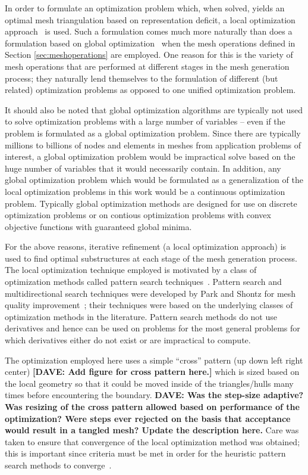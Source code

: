 In order to formulate an optimization problem which, when solved, yields 
an optimal mesh triangulation based on representation deficit, a local 
optimization approach~\cite{nocedal_wright_book} is used. Such a 
formulation comes much more naturally than does a formulation based on 
global optimization~\cite{global_optimization_book} when the 
mesh operations defined in Section \ref{sec:meshoperations} are 
employed.  One reason for this is the variety of mesh operations that are 
performed at different stages in the mesh generation process; they 
naturally lend themselves to the formulation of different (but related) 
optimization problems as opposed to one unified optimization problem.

It should also be noted that global optimization algorithms are typically 
not used to solve optimization problems with a large number of variables 
-- even if the problem is formulated as a global optimization problem.  
Since there are typically millions to billions of nodes and elements in 
meshes from application problems of interest, a global optimization 
problem would be impractical solve based on the huge number of variables 
that it would necessarily contain.  In addition, any global optimization 
problem which would be formulated as a generalization of the local 
optimization problems in this work would be a continuous optimization 
problem.  Typically global optimization methods are designed for use on 
discrete optimization problems or on contious optimization problems with 
convex objective functions with guaranteed global minima.

For the above reasons, iterative refinement (a local optimization 
approach) is used to find optimal substructures at each stage of the mesh 
generation process.  The local optimization technique employed is
motivated by a class of optimization methods called pattern search 
techniques~\cite{patternsearch1}.  Pattern search and multidirectional 
search techniques were developed by Park and Shontz for mesh quality 
improvement~\cite{patternsearch4}; their techniques were based on the 
underlying classes of optimization methods in the literature.  Pattern 
search methods do not use derivatives and hence can be used on problems for 
the most general problems for which derivatives either do not exist or are 
impractical to compute.

The optimization employed here uses a simple ``cross''
pattern (up down left right center) {\bf{[DAVE:  Add figure for cross 
pattern here.]}} which is sized based on the local geometry so that it 
could be moved inside of the triangles/hulls many times before 
encountering the boundary.  {\bf{DAVE:  Was the step-size adaptive?  Was 
resizing of the cross pattern allowed based on performance of the 
optimization?  Were steps ever rejected on the basis that acceptance would 
result in a tangled mesh? Update the description here.}}  Care was taken 
to ensure that convergence of the local optimization method was obtained; 
this is important since criteria must be met in order for the heuristic 
pattern search methods to converge~\cite{patternsearch2,patternsearch3}.
